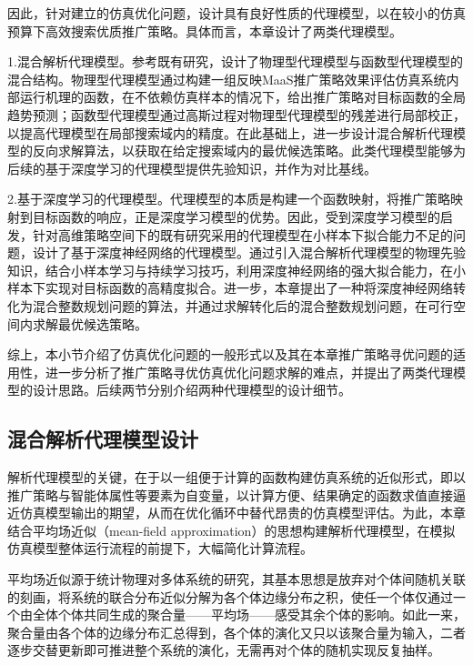 因此，针对建立的仿真优化问题，设计具有良好性质的代理模型，以在较小的仿真预算下高效搜索优质推广策略。具体而言，本章设计了两类代理模型。

1.混合解析代理模型。参考既有研究\citep{osorioSimulationBasedOptimizationFramework2013}，设计了物理型代理模型与函数型代理模型的混合结构。物理型代理模型通过构建一组反映MaaS推广策略效果评估仿真系统内部运行机理的函数，在不依赖仿真样本的情况下，给出推广策略对目标函数的全局趋势预测；函数型代理模型通过高斯过程对物理型代理模型的残差进行局部校正，以提高代理模型在局部搜索域内的精度。在此基础上，进一步设计混合解析代理模型的反向求解算法，以获取在给定搜索域内的最优候选策略。此类代理模型能够为后续的基于深度学习的代理模型提供先验知识，并作为对比基线。

2.基于深度学习的代理模型。代理模型的本质是构建一个函数映射，将推广策略映射到目标函数的响应，正是深度学习模型的优势。因此，受到深度学习模型的启发，针对高维策略空间下的既有研究采用的代理模型在小样本下拟合能力不足的问题，设计了基于深度神经网络的代理模型。通过引入混合解析代理模型的物理先验知识，结合小样本学习与持续学习技巧，利用深度神经网络的强大拟合能力，在小样本下实现对目标函数的高精度拟合。进一步，本章提出了一种将深度神经网络转化为混合整数规划问题的算法，并通过求解转化后的混合整数规划问题，在可行空间内求解最优候选策略。

综上，本小节介绍了仿真优化问题的一般形式以及其在本章推广策略寻优问题的适用性，进一步分析了推广策略寻优仿真优化问题求解的难点，并提出了两类代理模型的设计思路。后续两节分别介绍两种代理模型的设计细节。

\subsection{混合解析代理模型设计} \label{subsec.opt.anal.model}

解析代理模型的关键，在于以一组便于计算的函数构建仿真系统的近似形式，即以推广策略与智能体属性等要素为自变量，以计算方便、结果确定的函数求值直接逼近仿真模型输出的期望，从而在优化循环中替代昂贵的仿真模型评估。为此，本章结合平均场近似（mean-field approximation）的思想构建解析代理模型，在模拟仿真模型整体运行流程的前提下，大幅简化计算流程。

平均场近似源于统计物理对多体系统的研究，其基本思想是放弃对个体间随机关联的刻画，将系统的联合分布近似分解为各个体边缘分布之积，使任一个体仅通过一个由全体个体共同生成的聚合量——平均场——感受其余个体的影响。如此一来，聚合量由各个体的边缘分布汇总得到，各个体的演化又只以该聚合量为输入，二者逐步交替更新即可推进整个系统的演化，无需再对个体的随机实现反复抽样。

